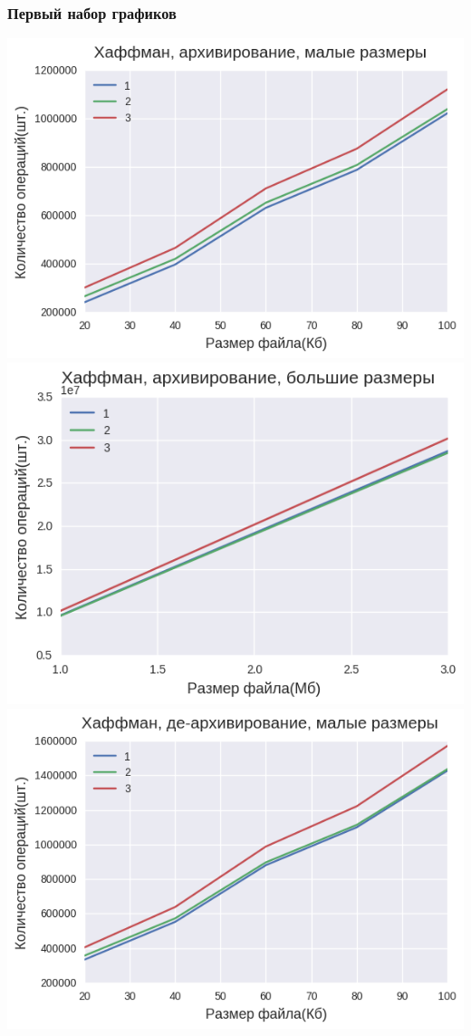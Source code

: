 \documentclass[russian, a4paper, 12pt]{article}
\begin{document}
\subsubsection{Первый набор графиков}
\begin{center}
\includegraphics[width=0.9\linewidth]{./plots/1/1_1_1_1.png}\\
\includegraphics[width=0.9\linewidth]{./plots/1/1_1_1_2.png}\\
\includegraphics[width=0.9\linewidth]{./plots/1/1_1_2_1.png}\\

\end{center}
\end{document}
